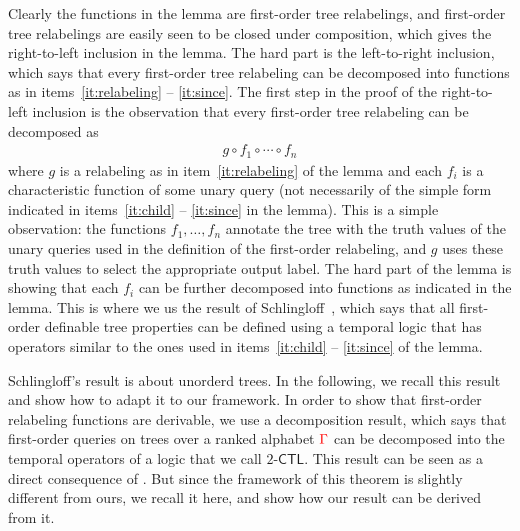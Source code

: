 Clearly the functions in the lemma are first-order tree relabelings, and first-order tree relabelings are easily seen to be closed under composition, which gives the right-to-left inclusion in the lemma. The hard part is the left-to-right inclusion, which says that every first-order tree relabeling can be decomposed into functions as in items~\ref{it:relabeling} -- \ref{it:since}. 
The first  step in the proof of  the right-to-left inclusion is the observation that  every first-order tree relabeling can be decomposed as 
\begin{align*}
    g \circ f_1 \circ \cdots \circ f_n
\end{align*}
where $g$ is a relabeling as in item~\ref{it:relabeling} of the lemma and each $f_i$ is a  characteristic function of some unary query (not necessarily of the simple form indicated in items~\ref{it:child} -- \ref{it:since} in the lemma). This is a simple observation: the functions $f_1,\ldots,f_n$ annotate the tree with the truth values of the unary queries used in the definition of the  first-order relabeling, and $g$ uses these truth values to select the appropriate output label. The hard part of the lemma is showing that each $f_i$  can be further decomposed into functions as indicated in the lemma. This is where we us the result of Schlingloff~\cite[Theorem 2.6]{schlingloff1992expressive}, which says that all first-order definable tree properties can be defined using a temporal logic that has operators similar to the ones used in items~\ref{it:child} -- \ref{it:since} of the lemma. 

Schlingloff's result is about unorderd trees. In the following, we recall this result and show how to adapt it to our framework.
In order to show that first-order relabeling functions are derivable, we use a decomposition result, which says that first-order queries on trees over a ranked alphabet ${\color{red}{\Gamma}}$ can be decomposed into the temporal operators of a logic that we call $2$-$\mathsf{CTL}$. 
This result can be seen as a direct consequence of \cite{}. But since the framework of this theorem is slightly different from ours, we recall it here, and show how our result can be derived from it.

